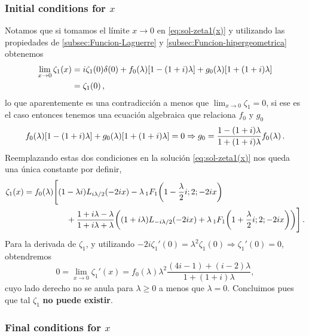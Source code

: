 \documentclass[%
 aip,
 jmp,%
 amsmath,amssymb,
 reprint,%
]{revtex4-2}
\begin{document}
{\subsubsection{\label{subsec:condiciones-iniciales-x}Initial conditions for $x$}

Notamos que si tomamos el límite $x\to0$ en \eqref{eq:sol-zeta1(x)} y utilizando las propiedades de \ref{subsec:Funcion-Laguerre} y \ref{subsec:Funcion-hipergeometrica} obtenemos
\begin{equation}
\begin{aligned}
    \lim_{x\to 0}\zeta_1(x)&=i\zeta_1(0)\delta(0)+f_0(\lambda)\qty[1-(1+i)\lambda] + g_0(\lambda)\qty[1+(1+i)\lambda]\\
    &=\zeta_1(0)\,,
\end{aligned}
\end{equation}
lo que aparentemente es una contradicción a menos que $\lim_{x\to0}\zeta_1=0$, si ese es el caso entonces tenemos una ecuación algebraica que relaciona $f_0$ y $g_0$
\begin{equation}
    f_0(\lambda)\qty[1-(1+i)\lambda] + g_0(\lambda)\qty[1+(1+i)\lambda]=0\Rightarrow g_0=\frac{1-(1+i)\lambda}{1+(1+i)\lambda}f_0(\lambda)\,.
\end{equation}
Reemplazando estas dos condiciones en la solución \eqref{eq:sol-zeta1(x)} nos queda una única constante por definir,
\begin{equation}
\begin{aligned}
    \zeta_1(x)=f_0(\lambda)\Bigg[&(1-\lambda i)L_{i\lambda/2}(-2ix)-\lambda \,_1F_1\qty(1-\frac{\lambda}{2}i;2;-2ix)\\
    &\quad +\frac{1+i\lambda-\lambda}{1+i\lambda+\lambda}\qty((1+i\lambda)L_{-i\lambda/2}(-2ix)+\lambda \,_1F_1\qty(1+\frac{\lambda}{2}i;2;-2ix))\Bigg]\,.
\end{aligned}
\end{equation}
Para la derivada de $\zeta_1$, y utilizando $-2i\zeta_1'(0) = \lambda^2 \zeta_1(0) \Rightarrow \zeta_1'(0) = 0$, obtendremos
\[
0= \lim_{x\to 0}    \zeta_1'(x)=f_0(\lambda)\lambda^2  \frac{(4i-1) +(i-2) \lambda}{1+(1+ i)\lambda},%
\]
cuyo lado derecho no se anula para $\lambda\geq 0$ a menos que $\lambda=0$. Concluimos pues que tal $\zeta_1$ \textbf{no puede existir}.

\subsubsection{\label{subsec:condiciones-finales}Final conditions for $x$}

}
\end{document}
